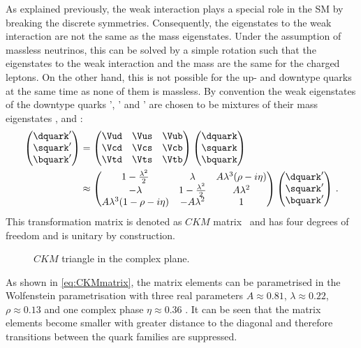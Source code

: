 As explained previously, the weak interaction plays a special role in the \ac{SM} by breaking the discrete symmetries.
Consequently, the eigenstates to the weak interaction are not the same as the mass eigenstates.
Under the assumption of massless neutrinos, this can be solved by a simple rotation such that the eigenstates to the weak interaction and the mass are the same for the charged leptons.
On the other hand, this is not possible for the up- and downtype quarks at the same time as none of them is massless.
By convention the weak eigenstates of the downtype quarks \dquark', \squark' and \bquark' are chosen to be mixtures of their mass eigenstates \dquark, \squark and \bquark:
\begin{align}
\begin{pmatrix} \dquark' \\ \squark' \\ \bquark' \end{pmatrix}
&= \begin{pmatrix} \Vud & \Vus & \Vub \\ \Vcd & \Vcs & \Vcb \\ \Vtd & \Vts & \Vtb \end{pmatrix}
\begin{pmatrix} \dquark \\ \squark \\ \bquark \end{pmatrix}\nonumber \\
&\approx \begin{pmatrix} 1-\frac{\lambda^2}{2} & \lambda & A\lambda^3(\rho-i\eta) \\
                        -\lambda & 1-\frac{\lambda^2}{2} & A\lambda^2 \\
                        A\lambda^3(1-\rho-i\eta) & -A\lambda^2 & 1 \end{pmatrix}
\begin{pmatrix} \dquark' \\ \squark' \\ \bquark' \end{pmatrix}\,. \label{eq:CKMmatrix}
\end{align}
This transformation matrix is denoted as $CKM$ matrix~\cite{Kobayashi:1973fv,PhysRevLett.10.531} and has four degrees of freedom and is unitary by construction.
\begin{figure}[tbp]
	\centering
	
	\caption{$CKM$ triangle in the complex plane.}
	\label{fig:ckmtheory}
\end{figure}
As shown in \cref{eq:CKMmatrix}, the matrix elements can be parametrised in the Wolfenstein parametrisation \cite{Wolfenstein:1983yz} with three real parameters $A\approx0.81$, $\lambda\approx0.22$, $\rho\approx0.13$ \cite{PDG2018} and one complex phase $\eta\approx0.36$ \cite{PDG2018}.
It can be seen that the matrix elements become smaller with greater distance to the diagonal and therefore transitions between the quark families are suppressed.

